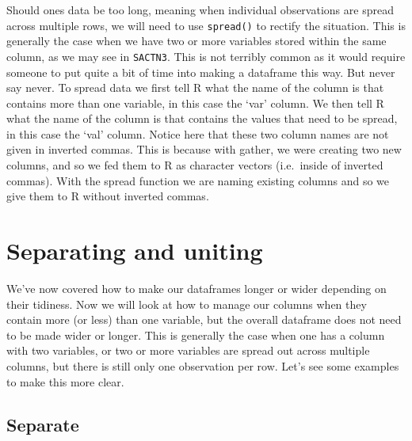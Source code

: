 \documentclass[]{book}
\newenvironment{Shaded}{\begin{snugshade}}{\end{snugshade}}
\newcommand{\KeywordTok}[1]{\textcolor[rgb]{0.13,0.29,0.53}{\textbf{#1}}}
\newcommand{\DataTypeTok}[1]{\textcolor[rgb]{0.13,0.29,0.53}{#1}}
\newcommand{\StringTok}[1]{\textcolor[rgb]{0.31,0.60,0.02}{#1}}
\newcommand{\OperatorTok}[1]{\textcolor[rgb]{0.81,0.36,0.00}{\textbf{#1}}}
\newcommand{\NormalTok}[1]{#1}
\theoremstyle{definition}
\theoremstyle{definition}
\theoremstyle{definition}
\theoremstyle{remark}
\begin{document}
Should ones data be too long, meaning when individual observations are
spread across multiple rows, we will need to use \texttt{spread()} to
rectify the situation. This is generally the case when we have two or
more variables stored within the same column, as we may see in
\texttt{SACTN3}. This is not terribly common as it would require someone
to put quite a bit of time into making a dataframe this way. But never
say never. To spread data we first tell R what the name of the column is
that contains more than one variable, in this case the `var' column. We
then tell R what the name of the column is that contains the values that
need to be spread, in this case the `val' column. Notice here that these
two column names are not given in inverted commas. This is because with
gather, we were creating two new columns, and so we fed them to R as
character vectors (i.e.~inside of inverted commas). With the spread
function we are naming existing columns and so we give them to R without
inverted commas.

\begin{Shaded}
\end{Shaded}

\section{Separating and uniting}\label{separating-and-uniting}

We've now covered how to make our dataframes longer or wider depending
on their tidiness. Now we will look at how to manage our columns when
they contain more (or less) than one variable, but the overall dataframe
does not need to be made wider or longer. This is generally the case
when one has a column with two variables, or two or more variables are
spread out across multiple columns, but there is still only one
observation per row. Let's see some examples to make this more clear.

\subsection{Separate}\label{separate}
\end{document}
